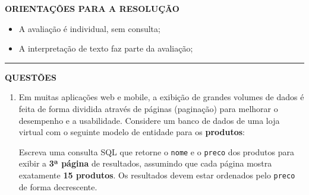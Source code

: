 \documentclass[12pt,a4paper]{article}
\begin{document}
\textbf{ORIENTAÇÕES PARA A RESOLUÇÃO}  

\begin{itemize}
    \item A avaliação é individual, sem consulta;
    \item A interpretação de texto faz parte da avaliação;
\end{itemize}

\vspace{0.5cm}

\begin{center}
    \rule{\textwidth}{0.4pt}
    \textbf{QUESTÕES}
\end{center}

\vspace{0.2cm}

\begin{enumerate}
    \item  Em muitas aplicações web e mobile, a exibição de grandes volumes de dados é feita de forma dividida através de páginas (paginação) para melhorar o desempenho e a usabilidade. Considere um banco de dados de uma loja virtual com o seguinte modelo de entidade para os \textbf{produtos}:
    
    \vspace{0.3cm}
    \begin{center}
    \end{center}
    \vspace{0.2cm}
    
    Escreva uma consulta SQL que retorne o \texttt{nome} e o \texttt{preco} dos produtos para exibir a \textbf{3ª página} de resultados, assumindo que cada página mostra exatamente \textbf{15 produtos}. Os resultados devem estar ordenados pelo \texttt{preco} de forma decrescente.
    

\end{enumerate}
\end{document}
